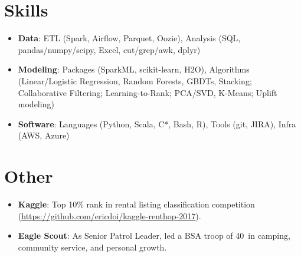 \documentclass[letterpaper,11pt]{article}
\newcommand{\plus}{\raisebox{.4\height}{\scalebox{.6}{+}}}
\newcommand{\resumeItem}[2]{
  \item\small{
    \textbf{#1}{: #2 \vspace{-2pt}}
  }
}
\newcommand{\resumeSubItem}[2]{\resumeItem{#1}{#2}\vspace{-4pt}}
\newcommand{\resumeSubHeadingListStart}{\begin{itemize}[leftmargin=*]}
\newcommand{\resumeSubHeadingListEnd}{\end{itemize}}
\begin{document}
\section{Skills}
\resumeSubHeadingListStart
\resumeItem{Data}{ETL (Spark, Airflow, Parquet, Oozie), Analysis (SQL, pandas/numpy/scipy, Excel, cut/grep/awk, dplyr)}
\resumeItem{Modeling}{Packages (SparkML, scikit-learn, H2O), Algorithms (Linear/Logistic Regression, Random Forests, GBDTs, Stacking; Collaborative Filtering; Learning-to-Rank; PCA/SVD, K-Means; Uplift modeling)}
\resumeItem{Software}{Languages (Python, Scala, C*, Bash, R), Tools (git, JIRA), Infra (AWS, Azure)}
\resumeSubHeadingListEnd

\section{Other}
  \resumeSubHeadingListStart
    \resumeSubItem{Kaggle}
      {Top 10\% rank in rental listing classification competition (\href{github.com/ericdoi/kaggle-renthop-2017}{https://github.com/ericdoi/kaggle-renthop-2017}).}
    \resumeSubItem{Eagle Scout}
      {As Senior Patrol Leader, led a BSA troop of 40\plus~in camping, community service, and personal growth.}
  \resumeSubHeadingListEnd


\end{document}
